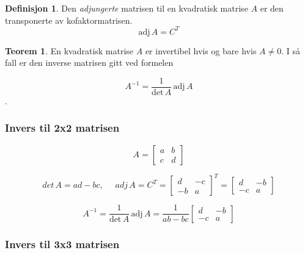 \documentclass[11pt]{article}
\theoremstyle{definition}
\newtheorem{mindef}{Definisjon}[section]
\newenvironment{fmindef}
{\begin{mdframed}[style=minstil]\begin{mindef}}
		{\end{mindef}\end{mdframed}}
\theoremstyle{definition}
\theoremstyle{definition}
\theoremstyle{definition}
\newtheorem{teo}{Teorem}[section]
\newenvironment{fteo}
{\begin{mdframed}[style=minstil]\begin{teo}}
		{\end{teo}\end{mdframed}}
\theoremstyle{definition}
\theoremstyle{definition}
\begin{document}
		\begin{fmindef}
			Den \textit{adjungerte} matrisen til en kvadratisk matrise \(A\) er den transponerte av kofaktormatrisen.
			\[\text{adj}\,A=C^{T} \]
		\end{fmindef}
		
		\begin{fteo}
			En kvadratisk matrise \(A\) er invertibel hvis og bare hvis \(A\neq 0\). 
			I så fall er den inverse matrisen gitt ved formelen
			
			\[A^{-1}=\frac{1}{\text{det}\, A}\,\text{adj}\,A \].
			
		\end{fteo}		
		
		\subsubsection{Invers til 2x2 matrisen}
	    
	    \[A=\left[\begin{array}{rr} 
	    a & b \\
	    c & d
	    \end{array} \right]\]
		
		\[det\,A=ad-bc, \hspace{16pt} adj\, A= C^T=\left[\begin{array}{rr} 
		d & -c \\
		-b & a
		\end{array} \right]^T=\left[\begin{array}{rr} 
		d & -b \\
		-c & a
		\end{array} \right] \]
		
		\[A^{-1}=\frac{1}{\text{det}\, A}\,\text{adj}\,A=\frac{1}{ab-bc}\left[\begin{array}{rr} 
		d & -b \\
		-c & a
		\end{array} \right] \]
		
		\newpage
		
		\subsubsection{Invers til 3x3 matrisen}
		
\end{document}
